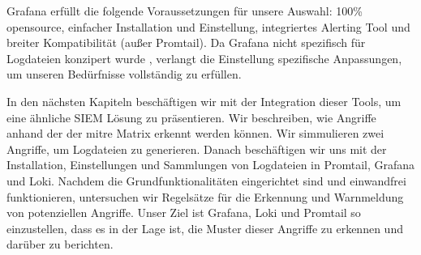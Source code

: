 Grafana erfüllt die folgende Voraussetzungen für unsere Auswahl: 100\% \gls{opensource}, einfacher Installation und Einstellung, integriertes Alerting Tool und breiter Kompatibilität (außer Promtail). Da Grafana nicht spezifisch für Logdateien konzipert wurde \citep{Yigal_GrafanaKibanan}, verlangt die Einstellung spezifische Anpassungen, um unseren Bedürfnisse vollständig zu erfüllen.

In den nächsten Kapiteln beschäftigen wir mit der Integration dieser Tools, um eine ähnliche \gls{SIEM} Lösung zu präsentieren. Wir beschreiben, wie Angriffe anhand der  der \gls{mitre} Matrix erkennt werden können. Wir simmulieren zwei Angriffe, um Logdateien zu generieren. Danach beschäftigen wir uns mit der Installation, Einstellungen und Sammlungen von Logdateien in Promtail, Grafana und Loki. Nachdem die Grundfunktionalitäten eingerichtet sind und einwandfrei funktionieren, untersuchen wir Regelsätze für die Erkennung und Warnmeldung von potenziellen Angriffe. Unser Ziel ist Grafana, Loki und Promtail so einzustellen, dass es in der Lage ist, die Muster dieser Angriffe zu erkennen und darüber zu berichten.
